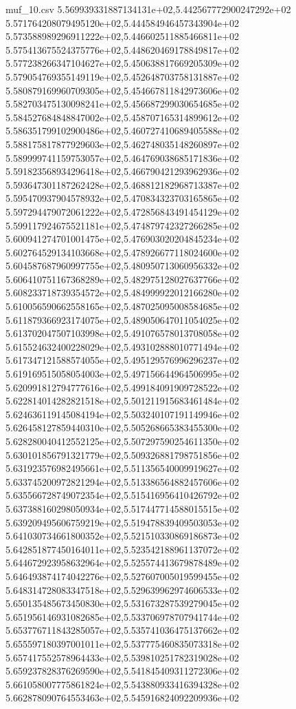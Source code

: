 \begin{filecontents*}{muf_10.csv}
5.569939331887134131e+02,5.442567772900247292e+02
5.571764208079495120e+02,5.444584946457343904e+02
5.573588989296911222e+02,5.446602511885466811e+02
5.575413675524375776e+02,5.448620469178849817e+02
5.577238266347104627e+02,5.450638817669205309e+02
5.579054769355149119e+02,5.452648703758131887e+02
5.580879169960709305e+02,5.454667811842973606e+02
5.582703475130098241e+02,5.456687299030654685e+02
5.584527684848847002e+02,5.458707165314899612e+02
5.586351799102900486e+02,5.460727410689405588e+02
5.588175817877929603e+02,5.462748035148260897e+02
5.589999741159753057e+02,5.464769038685171836e+02
5.591823568934296418e+02,5.466790421293962936e+02
5.593647301187262428e+02,5.468812182968713387e+02
5.595470937904578932e+02,5.470834323703165865e+02
5.597294479072061222e+02,5.472856843491454129e+02
5.599117924675521181e+02,5.474879742327266285e+02
5.600941274701001475e+02,5.476903020204845234e+02
5.602764529134103668e+02,5.478926677118024600e+02
5.604587687960997755e+02,5.480950713060956332e+02
5.606410751167368289e+02,5.482975128027637766e+02
5.608233718739354572e+02,5.484999922012166280e+02
5.610056590662558165e+02,5.487025095008584685e+02
5.611879366923174075e+02,5.489050647011054025e+02
5.613702047507103998e+02,5.491076578013708058e+02
5.615524632400228029e+02,5.493102888010771494e+02
5.617347121588574055e+02,5.495129576996296237e+02
5.619169515058054003e+02,5.497156644964506995e+02
5.620991812794777616e+02,5.499184091909728522e+02
5.622814014282821518e+02,5.501211915683461484e+02
5.624636119145084194e+02,5.503240107191149946e+02
5.626458127859440310e+02,5.505268665383455300e+02
5.628280040412552125e+02,5.507297590254611350e+02
5.630101856791321779e+02,5.509326881798751856e+02
5.631923576982495661e+02,5.511356540009919627e+02
5.633745200972821294e+02,5.513386564882457606e+02
5.635566728749072354e+02,5.515416956410426792e+02
5.637388160298050934e+02,5.517447714588015515e+02
5.639209495606759219e+02,5.519478839409503053e+02
5.641030734661800352e+02,5.521510330869186873e+02
5.642851877450164011e+02,5.523542188961137072e+02
5.644672923958632964e+02,5.525574413679878489e+02
5.646493874174042276e+02,5.527607005019599455e+02
5.648314728083347518e+02,5.529639962974606533e+02
5.650135485673450830e+02,5.531673287539279045e+02
5.651956146931082685e+02,5.533706978707941744e+02
5.653776711843285057e+02,5.535741036475137662e+02
5.655597180397001011e+02,5.537775460835073318e+02
5.657417552578964433e+02,5.539810251782319028e+02
5.659237828376269590e+02,5.541845409311272306e+02
5.661058007775861824e+02,5.543880933416394328e+02
5.662878090764553463e+02,5.545916824092209936e+02

\end{filecontents*}
